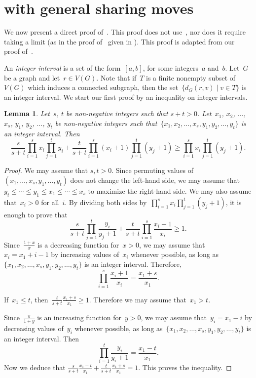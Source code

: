 \documentclass[reqno, 12pt]{amsart}
\numberwithin{equation}{section}
\numberwithin{figure}{section}
\theoremstyle{plain}
\newtheorem{lem}[thm]{Lemma}
\theoremstyle{definition}
\begin{document}
\printbibliography

 \appendix 
\section{\texorpdfstring{
 with general sharing moves}
{Proposition 2.1 with general sharing moves}}
\label{sec:appendix}

We now present a direct proof of~.  This proof does not use~, nor does it require taking a limit (as in the proof of~ given in ).  This proof is adapted from our proof of~. 

 
An \emph{integer interval} is a set of the form~${[a,b]}$, for some integers~$a$ and~$b$.
Let~$G$ be a graph and let~${r \in V(G)}$. 
Note that if~$T$ is a finite nonempty subset of~${V(G)}$ which induces a connected subgraph, then the set~${\{ d_G(r,v) \mid v \in T \}}$ is an integer interval. 
We start our first proof by an inequality on integer intervals. 
\begin{lem}
    \label{lem:ineq}
    Let~$s$, $t$ be non-negative integers such that $s+t>0$.
    Let~$x_1$, $x_2$, $\ldots$, $x_s$, $y_1$, $y_2$, $\ldots$, $y_t$ be non-negative integers 
    such that~${\{x_1,x_2,\ldots,x_s,y_1,y_2,\ldots,y_t\}}$ is an integer interval.
    Then 
    \[ 
        \frac{s}{s+t}\prod_{i=1}^s x_i \prod_{j=1}^t y_i 
        + \frac{t}{s+t}\prod_{i=1}^s (x_i+1)\prod_{j=1}^t (y_j+1) \geq \prod_{i=1}^s x_i \prod_{j=1}^t (y_j+1).
    \] 
\end{lem}

\begin{proof}
    We may assume that $s,t>0$.
    Since permuting values of~${(x_1,\ldots,x_s,y_1,\ldots,y_t)}$ does not change the left-hand side, 
    we may assume that~${y_t \leq \cdots \leq y_1 \leq x_1 \leq \cdots \leq x_s}$ to maximize the right-hand side. 
    We may also assume that~${x_i > 0}$ for all~$i$. 
    By dividing both sides by~${\prod_{i=1}^s x_i \prod_{j=1}^t (y_j+1)}$, it is enough to prove that 
    \[ 
        \frac{s}{s+t}\prod_{j=1}^t \frac{y_i}{y_j+1}
        + \frac{t}{s+t}\prod_{i=1}^s \frac{x_i+1}{x_i} \geq 1. 
    \] 
    Since~${\frac{1+x}{x}}$ is a decreasing function for~${x > 0}$, we may assume that~${x_i = x_1 + i - 1}$ by increasing values of~$x_i$ whenever possible, as long as~${\{ x_1, x_2, \ldots, x_s, y_1, y_2, \ldots, y_t \}}$ is an integer interval.
    Therefore, 
    \[
        \prod_{i=1}^s \frac{x_i+1}{x_i} = \frac{x_1+s}{x_1}. 
    \]

    If~${x_1 \leq t}$, then~${\frac{t}{s+t} \frac{x_1+s}{x_1} \geq 1}$. 
    Therefore we may assume that~${x_1 > t}$. 

    Since~${\frac{y}{1+y}}$ is an increasing function for~${y > 0}$, we may assume that~${y_i = x_1 - i}$ by decreasing values of~$y_i$ whenever possible, as long as~${\{ x_1, x_2, \ldots, x_s, y_1, y_2, \ldots, y_t \}}$ is an integer interval. 
    Then 
    \[ 
        \prod_{i=1}^t \frac{y_i}{y_i+1} = \frac{x_1-t}{x_1}. 
    \]
    Now we deduce that 
    \(
        \frac{s}{s+t} \frac{x_1-t}{x_1}+ \frac{t}{s+t} \frac{x_1+s}{x_1} = 1
    \). 
    This proves the inequality. 
\end{proof}
\end{document}
